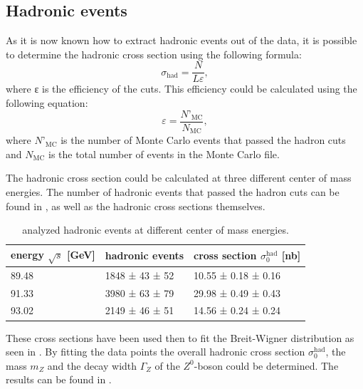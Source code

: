 \documentclass[epj,nopacs]{svjour}
\begin{document}
\subsection{Hadronic events}
As it is now known how to extract hadronic events out of the data, it is
possible to determine the hadronic cross section using the following formula:
\begin{equation}
σ_{\mathrm{had}} = \frac{N}{Lε},
\end{equation}
where ε is the efficiency of the cuts. This efficiency could be calculated
using the following equation:
\begin{equation}
ε = \frac{N’_{\mathrm{MC}}}{N_{\mathrm{MC}}},
\end{equation}
where $N’_{\mathrm{MC}}$ is the number of Monte Carlo events that passed the
hadron cuts and $N_{\mathrm{MC}}$ is the total number of events in the Monte
Carlo file.

The hadronic cross section could be calculated at three different center of
mass energies. The number of hadronic events that passed the hadron cuts can be
found in , as well as the hadronic cross sections themselves.

\begin{table}[h]
\begin{center}
\begin{tabular}{|l|l|l|}
\hline
energy $\sqrt{s}$ [\si{\GeV}] & hadronic events & cross section $σ_0^{\mathrm{had}}$ [\si{\nano\barn}]\\
\hline
89.48 & 1848 ± 43 ± 52 & 10.55 ± 0.18 ± 0.16 \\
91.33 & 3980 ± 63 ± 79 & 29.98 ± 0.49 ± 0.43 \\
93.02 & 2149 ± 46 ± 51 & 14.56 ± 0.24 ± 0.24 \\
\hline
\end{tabular}
\vspace*{0.3cm}
\caption{\baselineskip=0.38cm analyzed hadronic events at different center of mass energies.}
\label{tab:hadr_events}
\end{center}
\vspace*{-0.5cm}
\end{table}

These cross sections have been used then to fit the Breit-Wigner distribution as
seen in .
By fitting the data
points the overall hadronic cross section $σ_0^{\mathrm{had}}$, the mass $m_Z$ and the decay width $Γ_Z$
of the $Z^0$-boson could be determined. The results can be found in
.
\end{document}
